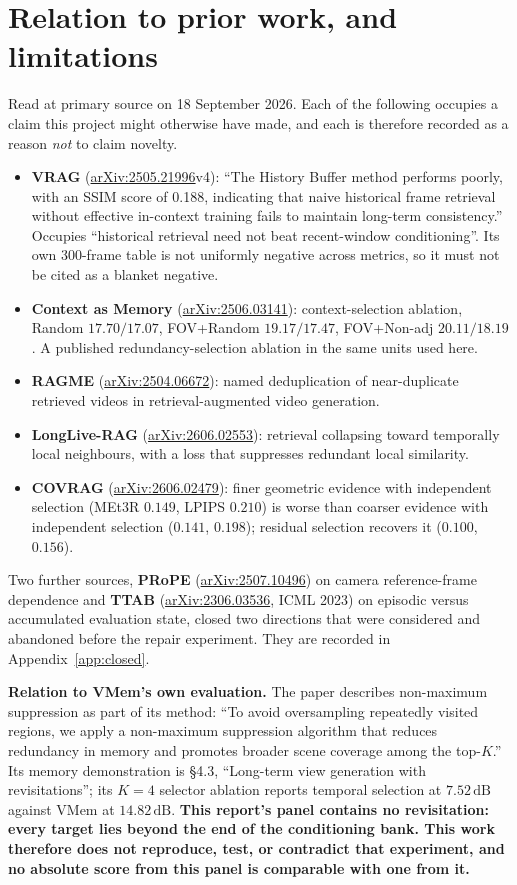 \documentclass[11pt,a4paper]{article}
\newcommand{\arxiv}[1]{\href{https://arxiv.org/abs/#1}{arXiv:#1}}
\newcommand{\dB}{\,\mathrm{dB}}
\begin{document}
\section{Relation to prior work, and limitations}

Read at primary source on 18 September 2026. Each of the following occupies a claim this project
might otherwise have made, and each is therefore recorded as a reason \emph{not} to claim novelty.

\begin{itemize}
\item \textbf{VRAG} (\arxiv{2505.21996}v4): ``The History Buffer method performs poorly, with an SSIM
score of 0.188, indicating that naive historical frame retrieval without effective in-context
training fails to maintain long-term consistency.'' Occupies ``historical retrieval need not beat
recent-window conditioning''. Its own 300-frame table is not uniformly negative across metrics, so it
must not be cited as a blanket negative.
\item \textbf{Context as Memory} (\arxiv{2506.03141}): context-selection ablation, Random
$17.70/17.07$, FOV+Random $19.17/17.47$, FOV+Non-adj $20.11/18.19$. A published redundancy-selection
ablation in the same units used here.
\item \textbf{RAGME} (\arxiv{2504.06672}): named deduplication of near-duplicate retrieved videos in
retrieval-augmented video generation.
\item \textbf{LongLive-RAG} (\arxiv{2606.02553}): retrieval collapsing toward temporally local
neighbours, with a loss that suppresses redundant local similarity.
\item \textbf{COVRAG} (\arxiv{2606.02479}): finer geometric evidence with independent selection
(MEt3R $0.149$, LPIPS $0.210$) is worse than coarser evidence with independent selection
($0.141$, $0.198$); residual selection recovers it ($0.100$, $0.156$).
\end{itemize}

Two further sources, \textbf{PRoPE} (\arxiv{2507.10496}) on camera reference-frame dependence and
\textbf{TTAB} (\arxiv{2306.03536}, ICML 2023) on episodic versus accumulated evaluation state, closed
two directions that were considered and abandoned before the repair experiment. They are recorded in
Appendix~\ref{app:closed}.

\textbf{Relation to VMem's own evaluation.} The paper describes non-maximum suppression as part of
its method: ``To avoid oversampling repeatedly visited regions, we apply a non-maximum suppression
algorithm that reduces redundancy in memory and promotes broader scene coverage among the top-$K$.''
Its memory demonstration is \S4.3, ``Long-term view generation with revisitations''; its $K=4$
selector ablation reports temporal selection at $7.52\dB$ against VMem at $14.82\dB$. \textbf{This
report's panel contains no revisitation: every target lies beyond the end of the conditioning bank.
This work therefore does not reproduce, test, or contradict that experiment, and no absolute score
from this panel is comparable with one from it.}
\end{document}
